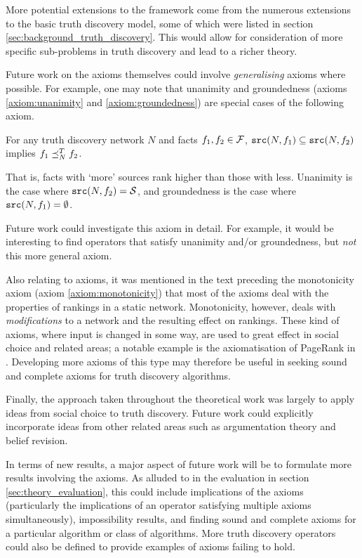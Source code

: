 \documentclass[../main.tex]{subfiles}
\begin{document}
More potential extensions to the framework come from the numerous extensions to
the basic truth discovery model, some of which were listed in section
\ref{sec:background_truth_discovery}. This would allow for consideration of
more specific sub-problems in truth discovery and lead to a richer theory.

Future work on the axioms themselves could involve \emph{generalising} axioms
where possible. For example, one may note that unanimity and groundedness
(axioms \ref{axiom:unanimity} and \ref{axiom:groundedness}) are special cases
of the following axiom.

\begin{axiom}
For any truth discovery network $N$ and facts $f_1, f_2 \in \mathcal{F}$, $\texttt{src}(N,
f_1) \subseteq \texttt{src}(N, f_2)$ implies $f_1 \preceq_N^T f_2$.
\end{axiom}

That is, facts with `more' sources rank higher than those with
less.\footnotemark{} Unanimity is the case where $\texttt{src}(N, f_2) = \mathcal{S}$, and
groundedness is the case where $\texttt{src}(N, f_1) = \emptyset$.


Future work could investigate this axiom in detail. For example, it would be
interesting to find operators that satisfy unanimity and/or groundedness, but
\emph{not} this more general axiom.

Also relating to axioms, it was mentioned in the text preceding the
monotonicity axiom (axiom \ref{axiom:monotonicity}) that most of the axioms
deal with the properties of rankings in a static network. Monotonicity,
however, deals with \emph{modifications} to a network and the resulting effect
on rankings. These kind of axioms, where input is changed in some way, are
used to great effect in social choice and related areas; a notable example is
the axiomatisation of PageRank \cite{page_brin_et_al} in \cite{altman}.
Developing more axioms of this type may therefore be useful in seeking sound
and complete axioms for truth discovery algorithms.

Finally, the approach taken throughout the theoretical work was largely to
apply ideas from social choice to truth discovery. Future work could explicitly
incorporate ideas from other related areas such as argumentation theory and
belief revision.

In terms of new results, a major aspect of future work will be to formulate
more results involving the axioms. As alluded to in the evaluation in section
\ref{sec:theory_evaluation}, this could include implications of the axioms
(particularly the implications of an operator satisfying multiple axioms
simultaneously), impossibility results, and finding sound and complete axioms
for a particular algorithm or class of algorithms. More truth discovery
operators could also be defined to provide examples of axioms failing to hold.
\end{document}
